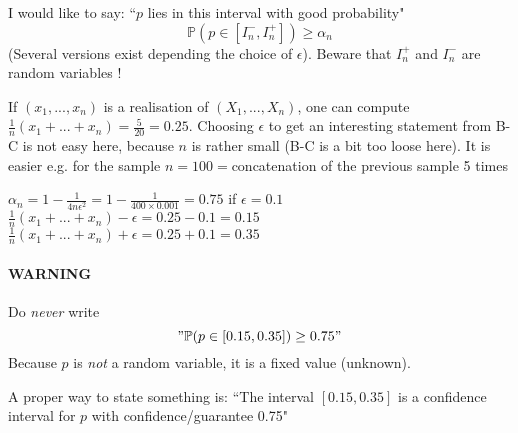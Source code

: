 \documentclass{article}
\begin{document}
I would like to say: ``$p$ lies in this interval with good probability"
\[\mathbb{P}(p\in [I_n^-,I_n^+])\geq \alpha_n \]
(Several versions exist depending the choice of $\epsilon$). Beware that $I_n^+$ and $I_n^-$ are random variables !

If $(x_1,...,x_n)$ is a realisation of $(X_1,...,X_n)$, one can compute $\frac{1}{n}(x_1+...+x_n)=\frac{5}{20}=0.25$. Choosing $\epsilon$ to get an interesting statement from B-C is not easy here, because $n$ is rather small (B-C is a bit too loose here). It is easier e.g. for the sample $n=100=$concatenation of the previous sample 5 times

$\alpha_n=1-\frac{1}{4n\epsilon^2}=1-\frac{1}{400\times0.001}=0.75$ if $\epsilon = 0.1$\\
$\frac{1}{n}(x_1+...+x_n)-\epsilon=0.25-0.1=0.15$\\
$\frac{1}{n}(x_1+...+x_n)+\epsilon=0.25+0.1=0.35$


\paragraph{WARNING} Do \emph{never} write
\["\mathbb{P}(p\in [0.15,0.35])\geq 0.75 "\]
Because $p$ is \emph{not} a random variable, it is a fixed value (unknown).


A proper way to state something is: ``The interval $[0.15,0.35]$ is a confidence interval for $p$ with confidence/guarantee 0.75"
\end{document}
